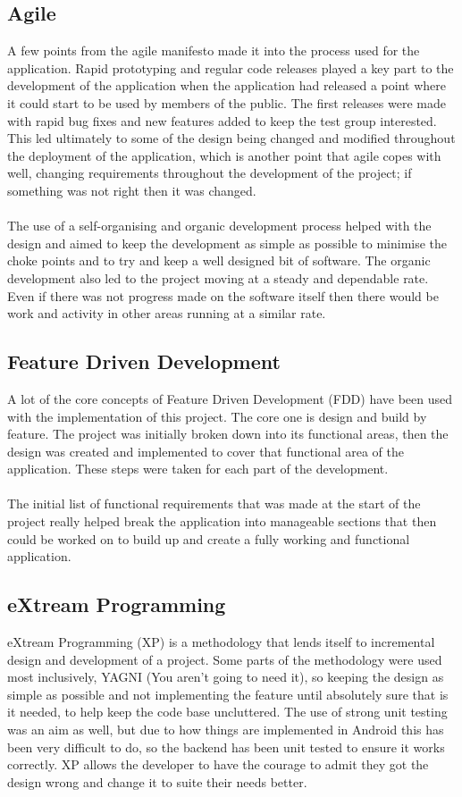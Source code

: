 \subsection{Agile}

A few points from the agile manifesto made it into the process used for the application. Rapid prototyping and regular code releases played a key part to the development of the application when the application had released a point where it could start to be used by members of the public. The first releases were made with rapid bug fixes and new features added to keep the test group interested. This led ultimately to some of the design being changed and modified throughout the deployment of the application, which is another point that agile copes with well, changing requirements throughout the development of the project; if something was not right then it was changed.\\
\\
The use of a self-organising and organic development process helped with the design and aimed to keep the development as simple as possible to minimise the choke points and to try and keep a well designed bit of software. The organic development also led to the project moving at a steady and dependable rate. Even if there was not progress made on the software itself then there would be work and activity in other areas running at a similar rate.

\subsection{Feature Driven Development}

A lot of the core concepts of Feature Driven Development (FDD) have been used with the implementation of this project. The core one is design and build by feature. The project was initially broken down into its functional areas, then the design was created and implemented to cover that functional area of the application. These steps were taken for each part of the development.\\
\\
The initial list of functional requirements that was made at the start of the project really helped break the application into manageable sections that then could be worked on to build up and create a fully working and functional application.

\subsection{eXtream Programming}

eXtream Programming (XP) is a methodology that lends itself to incremental design and development of a project. Some parts of the methodology were used most inclusively, YAGNI (You aren't going to need it), so keeping the design as simple as possible and not implementing the feature until absolutely sure that is it needed, to help keep the code base uncluttered. The use of strong unit testing was an aim as well, but due to how things are implemented in Android this has been very difficult to do, so the backend has been unit tested to ensure it works correctly. XP allows the developer to have the courage to admit they got the design wrong and change it to suite their needs better.
